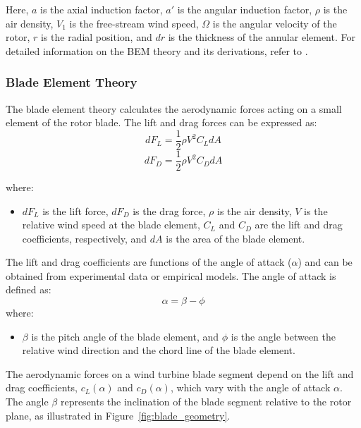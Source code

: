 Here, $a$ is the axial induction factor, $a'$ is the angular induction factor, $\rho$ is the air density, $V_1$ is the free-stream wind speed, $\Omega$ is the angular velocity of the rotor, $r$ is the radial position, and $dr$ is the thickness of the annular element. For detailed information on the BEM theory and its derivations, refer to \cite{ingram2011blade}.
\subsubsection{Blade Element Theory}
The blade element theory calculates the aerodynamic forces acting on a small element of the rotor blade. The lift and drag forces can be expressed as:
\begin{equation}
dF_L = \frac{1}{2} \rho V^2 C_L dA
\end{equation}
\begin{equation}
dF_D = \frac{1}{2} \rho V^2 C_D dA
\end{equation}

where:
\begin{itemize}
    \item $dF_L$ is the lift force, $dF_D$ is the drag force, $\rho$ is the air density, $V$ is the relative wind speed at the blade element, $C_L$ and $C_D$ are the lift and drag coefficients, respectively, and $dA$ is the area of the blade element.
\end{itemize}
The lift and drag coefficients are functions of the angle of attack ($\alpha$) and can be obtained from experimental data or empirical models. The angle of attack is defined as:
\begin{equation}
\alpha = \beta - \phi
\end{equation}
where:
\begin{itemize}
    \item $\beta$ is the pitch angle of the blade element, and $\phi$ is the angle between the relative wind direction and the chord line of the blade element.
\end{itemize}
The aerodynamic forces on a wind turbine blade segment depend on the lift and drag coefficients, $c_L(\alpha)$ and $c_D(\alpha)$, which vary with the angle of attack $\alpha$. The angle $\beta$ represents the inclination of the blade segment relative to the rotor plane, as illustrated in Figure~\ref{fig:blade_geometry}.

